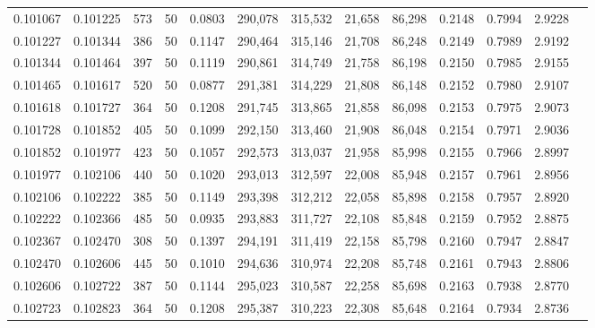 \begin{tabular}{rrrrrrrrrrrrr}
0.101067 & 0.101225 &   573 &  50 &                                     0.0803 & 290,078 & 315,532 &  21,658 &  86,298 & 0.2148 & 0.7994 & 2.9228 \\
0.101227 & 0.101344 &   386 &  50 &                                     0.1147 & 290,464 & 315,146 &  21,708 &  86,248 & 0.2149 & 0.7989 & 2.9192 \\
0.101344 & 0.101464 &   397 &  50 &                                     0.1119 & 290,861 & 314,749 &  21,758 &  86,198 & 0.2150 & 0.7985 & 2.9155 \\
0.101465 & 0.101617 &   520 &  50 &                                     0.0877 & 291,381 & 314,229 &  21,808 &  86,148 & 0.2152 & 0.7980 & 2.9107 \\
0.101618 & 0.101727 &   364 &  50 &                                     0.1208 & 291,745 & 313,865 &  21,858 &  86,098 & 0.2153 & 0.7975 & 2.9073 \\
0.101728 & 0.101852 &   405 &  50 &                                     0.1099 & 292,150 & 313,460 &  21,908 &  86,048 & 0.2154 & 0.7971 & 2.9036 \\
0.101852 & 0.101977 &   423 &  50 &                                     0.1057 & 292,573 & 313,037 &  21,958 &  85,998 & 0.2155 & 0.7966 & 2.8997 \\
0.101977 & 0.102106 &   440 &  50 &                                     0.1020 & 293,013 & 312,597 &  22,008 &  85,948 & 0.2157 & 0.7961 & 2.8956 \\
0.102106 & 0.102222 &   385 &  50 &                                     0.1149 & 293,398 & 312,212 &  22,058 &  85,898 & 0.2158 & 0.7957 & 2.8920 \\
0.102222 & 0.102366 &   485 &  50 &                                     0.0935 & 293,883 & 311,727 &  22,108 &  85,848 & 0.2159 & 0.7952 & 2.8875 \\
0.102367 & 0.102470 &   308 &  50 &                                     0.1397 & 294,191 & 311,419 &  22,158 &  85,798 & 0.2160 & 0.7947 & 2.8847 \\
0.102470 & 0.102606 &   445 &  50 &                                     0.1010 & 294,636 & 310,974 &  22,208 &  85,748 & 0.2161 & 0.7943 & 2.8806 \\
0.102606 & 0.102722 &   387 &  50 &                                     0.1144 & 295,023 & 310,587 &  22,258 &  85,698 & 0.2163 & 0.7938 & 2.8770 \\
0.102723 & 0.102823 &   364 &  50 &                                     0.1208 & 295,387 & 310,223 &  22,308 &  85,648 & 0.2164 & 0.7934 & 2.8736 \\

\end{tabular}
